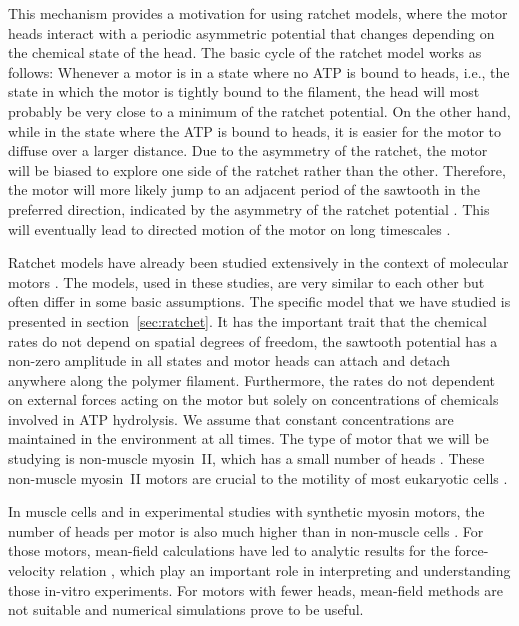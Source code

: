 \documentclass[aps,pre,twocolumn,showpacs,showkeys,superscriptaddress,floatfix]{revtex4-1}
\begin{document}
This mechanism provides a motivation for using ratchet models, 
where the motor heads interact with a periodic asymmetric potential that changes depending on the chemical state of the head. 
The basic cycle of the ratchet model works as follows:
Whenever a motor is in a state where no ATP is bound to heads, i.e., the state in which the motor is tightly bound to the filament, 
the head will most probably be very close to a minimum of the ratchet potential. 
On the other hand, while in the state where the ATP is bound to heads, it is easier for the motor to diffuse over a larger distance. 
Due to the asymmetry of the ratchet, the motor will be biased to explore one side of the ratchet rather than the other. 
Therefore, the motor will more likely jump to an adjacent period of the sawtooth in the preferred direction, indicated by the asymmetry of the ratchet potential \cite{reimann2002brownian}.
This will eventually lead to directed motion of the motor on long timescales \cite{hoffmann2016molecular,Reimann2002introduction,de2007symmetries}. 

Ratchet models have already been studied extensively in the context of molecular motors \cite{reimann2002brownian,astumian1994fluctuation,astumian1996mechanochemical,julicher1997modeling,Reimann2002introduction,julicher1997spontaneous,peskin1995correlation,huxley1969mechanism,huxley1971proposed}.
The models, used in these studies, are very similar to each other but often differ in some basic assumptions.
The specific model that we have studied is presented in section~\ref{sec:ratchet}. 
It has the important trait that the chemical rates do not depend on spatial degrees of freedom, 
the sawtooth potential has a non-zero amplitude in all states 
and motor heads can attach and detach anywhere along the polymer filament.
Furthermore, the rates do not dependent on external forces acting on the motor but solely on concentrations of chemicals involved in ATP hydrolysis. 
We assume that constant concentrations are maintained in the environment at all times. 
The type of motor that we will be studying is non-muscle myosin~II, which has a small number of heads \cite{pollard1982structure}. 
These non-muscle myosin~II motors are crucial to the motility of most eukaryotic cells \cite{vicente2009non}.

In muscle cells and in experimental studies with synthetic myosin motors, 
the number of heads per motor is also much higher than in non-muscle cells \cite{brown2009cross-correlated}.
For those motors, mean-field calculations have led to analytic results for the force-velocity relation \cite{julicher1997modeling},
which play an important role in interpreting and understanding those in-vitro experiments.
For motors with fewer heads, mean-field methods are not suitable and numerical simulations prove to be useful.
\end{document}
